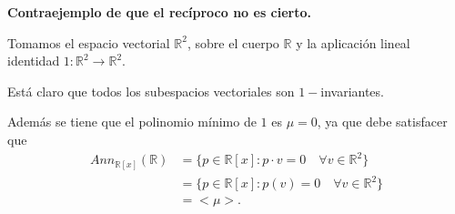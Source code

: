 \documentclass{article}
\newcommand{\R}{\mathbb{R}}
\begin{document}
\textbf{Contraejemplo de que el recíproco no es cierto.}

Tomamos el espacio vectorial $\R^2$, sobre el cuerpo $\R$ y la aplicación lineal identidad $1: \R^2 \longrightarrow \R^2$. 

Está claro que todos los subespacios vectoriales son $1-$invariantes. 

Además se tiene que el polinomio mínimo de $1$ es $\mu = 0$, ya que debe satisfacer que 
\begin{align*}
    Ann_{\R[x]}(\R) 
    &= 
    \{
        p \in \R[x] : p \cdot v = 0 \quad \forall v \in \R^2
    \}
    \\
    &= 
    \{
        p \in \R[x] : p(v) = 0 \quad \forall v \in \R^2
    \}
    \\
    &= <\mu>.
\end{align*}
\end{document}

